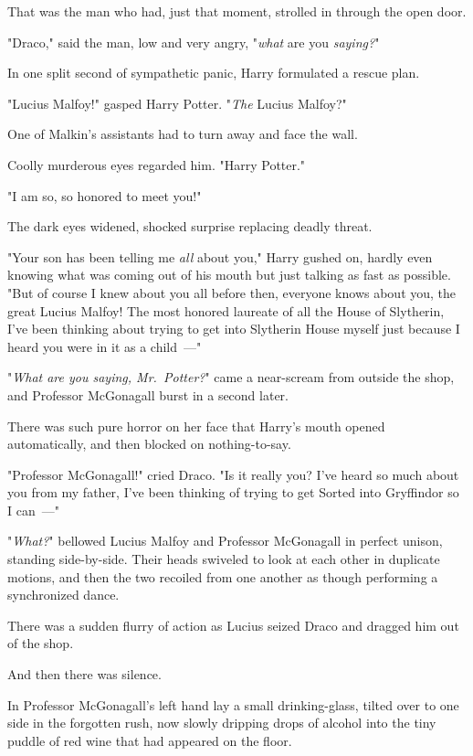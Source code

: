 That was the man who had, just that moment, strolled in through the open door.

"Draco," said the man, low and very angry, "\emph{what} are you \emph{saying?}"

In one split second of sympathetic panic, Harry formulated a rescue plan.

"Lucius Malfoy!" gasped Harry Potter. "\emph{The} Lucius Malfoy?"

One of Malkin's assistants had to turn away and face the wall.

Coolly murderous eyes regarded him. "Harry Potter."

"I am so, so honored to meet you!"

The dark eyes widened, shocked surprise replacing deadly threat.

"Your son has been telling me \emph{all} about you," Harry gushed on, hardly
even knowing what was coming out of his mouth but just talking as fast as
possible. "But of course I knew about you all before then, everyone knows about
you, the great Lucius Malfoy! The most honored laureate of all the House of
Slytherin, I've been thinking about trying to get into Slytherin House myself
just because I heard you were in it as a child~---"

"\emph{What are you saying, Mr.~Potter?}" came a near-scream from outside the
shop, and Professor McGonagall burst in a second later.

There was such pure horror on her face that Harry's mouth opened automatically,
and then blocked on nothing-to-say.

"Professor McGonagall!" cried Draco. "Is it really you? I've heard so much
about you from my father, I've been thinking of trying to get Sorted into
Gryffindor so I can~---"

"\emph{What?}" bellowed Lucius Malfoy and Professor McGonagall in perfect
unison, standing side-by-side. Their heads swiveled to look at each other in
duplicate motions, and then the two recoiled from one another as though
performing a synchronized dance.

There was a sudden flurry of action as Lucius seized Draco and dragged him out
of the shop.

And then there was silence.

In Professor McGonagall's left hand lay a small drinking-glass, tilted over to
one side in the forgotten rush, now slowly dripping drops of alcohol into the
tiny puddle of red wine that had appeared on the floor.

